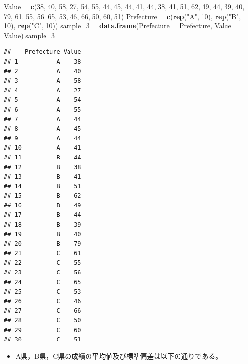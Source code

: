 \documentclass[]{article}
\newenvironment{Shaded}{\begin{snugshade}}{\end{snugshade}}
\newcommand{\KeywordTok}[1]{\textcolor[rgb]{0.13,0.29,0.53}{\textbf{#1}}}
\newcommand{\DataTypeTok}[1]{\textcolor[rgb]{0.13,0.29,0.53}{#1}}
\newcommand{\DecValTok}[1]{\textcolor[rgb]{0.00,0.00,0.81}{#1}}
\newcommand{\StringTok}[1]{\textcolor[rgb]{0.31,0.60,0.02}{#1}}
\newcommand{\NormalTok}[1]{#1}
\providecommand{\tightlist}{%
  \setlength{\itemsep}{0pt}\setlength{\parskip}{0pt}}
\begin{document}
\begin{Shaded}
\begin{Highlighting}[]
\NormalTok{Value =}\StringTok{ }\KeywordTok{c}\NormalTok{(}\DecValTok{38}\NormalTok{, }\DecValTok{40}\NormalTok{, }\DecValTok{58}\NormalTok{, }\DecValTok{27}\NormalTok{, }\DecValTok{54}\NormalTok{, }\DecValTok{55}\NormalTok{, }\DecValTok{44}\NormalTok{, }\DecValTok{45}\NormalTok{, }\DecValTok{44}\NormalTok{, }\DecValTok{41}\NormalTok{, }\DecValTok{44}\NormalTok{, }\DecValTok{38}\NormalTok{, }\DecValTok{41}\NormalTok{, }\DecValTok{51}\NormalTok{, }\DecValTok{62}\NormalTok{, }\DecValTok{49}\NormalTok{, }\DecValTok{44}\NormalTok{, }\DecValTok{39}\NormalTok{, }\DecValTok{40}\NormalTok{, }\DecValTok{79}\NormalTok{, }\DecValTok{61}\NormalTok{, }\DecValTok{55}\NormalTok{, }\DecValTok{56}\NormalTok{, }\DecValTok{65}\NormalTok{, }\DecValTok{53}\NormalTok{, }\DecValTok{46}\NormalTok{, }\DecValTok{66}\NormalTok{, }\DecValTok{50}\NormalTok{, }\DecValTok{60}\NormalTok{, }\DecValTok{51}\NormalTok{)}
\NormalTok{Prefecture =}\StringTok{ }\KeywordTok{c}\NormalTok{(}\KeywordTok{rep}\NormalTok{(}\StringTok{"A"}\NormalTok{, }\DecValTok{10}\NormalTok{), }\KeywordTok{rep}\NormalTok{(}\StringTok{"B"}\NormalTok{, }\DecValTok{10}\NormalTok{), }\KeywordTok{rep}\NormalTok{(}\StringTok{"C"}\NormalTok{, }\DecValTok{10}\NormalTok{))}
\NormalTok{sample_}\DecValTok{3}\NormalTok{ =}\StringTok{ }\KeywordTok{data.frame}\NormalTok{(}\DataTypeTok{Prefecture =}\NormalTok{ Prefecture, }\DataTypeTok{Value =}\NormalTok{ Value)}
\NormalTok{sample_}\DecValTok{3}
\end{Highlighting}
\end{Shaded}

\begin{verbatim}
##    Prefecture Value
## 1           A    38
## 2           A    40
## 3           A    58
## 4           A    27
## 5           A    54
## 6           A    55
## 7           A    44
## 8           A    45
## 9           A    44
## 10          A    41
## 11          B    44
## 12          B    38
## 13          B    41
## 14          B    51
## 15          B    62
## 16          B    49
## 17          B    44
## 18          B    39
## 19          B    40
## 20          B    79
## 21          C    61
## 22          C    55
## 23          C    56
## 24          C    65
## 25          C    53
## 26          C    46
## 27          C    66
## 28          C    50
## 29          C    60
## 30          C    51
\end{verbatim}

\begin{itemize}
\tightlist
\item
  A県，B県，C県の成績の平均値及び標準偏差は以下の通りである。
\end{itemize}
\end{document}
